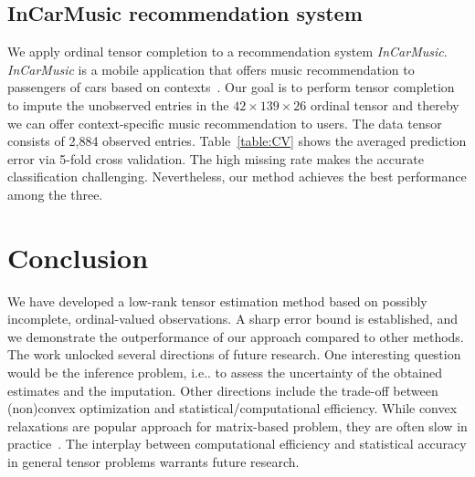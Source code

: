 \documentclass{article}
\theoremstyle{plain}
\theoremstyle{definition}
\begin{document}
\subsection{InCarMusic recommendation system}
We apply ordinal tensor completion to a recommendation system {\it InCarMusic}. {\it InCarMusic} is a mobile application that offers music recommendation to passengers of cars based on contexts~\cite{baltrunas2011incarmusic}. Our goal is to perform tensor completion to impute the unobserved entries in the $42\times 139\times 26$ ordinal tensor and thereby we can offer context-specific music recommendation to users. The data tensor consists of 2,884 observed entries. Table~\ref{table:CV} shows the averaged prediction error via 5-fold cross validation. The high missing rate makes the accurate classification challenging. Nevertheless, our method achieves the best performance among the three.


\section{Conclusion}
We have developed a low-rank tensor estimation method based on possibly incomplete, ordinal-valued observations. A sharp error bound is established, and we demonstrate the outperformance of our approach compared to other methods. The work unlocked several directions of future research. One interesting question would be the inference problem, i.e.. to assess the uncertainty of the obtained estimates and the imputation. Other directions include the trade-off between (non)convex optimization and statistical/computational efficiency. While convex relaxations are popular approach for matrix-based problem, they are often slow in practice~\cite{chen2019non}. The interplay between computational efficiency and statistical accuracy in general tensor problems warrants future research. 

\newpage


\end{document}
